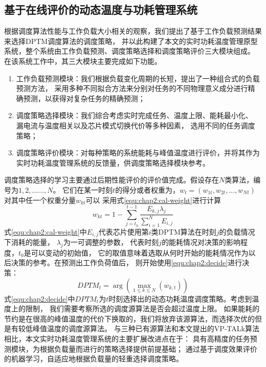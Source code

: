 \subsection{基于在线评价的动态温度与功耗管理系统}
根据调度算法性能与工作负载大小相关的观察，我们提出了基于工作负载预测结果来选择DPTM调度算法的调度策略， 并以此构建了本文的实时功耗温度管理原型系统，整个系统由工作负载预测、调度策略选择和调度策略评价三大模块组成。
在该系统工作中，其三大模块主要完成如下功能。
\begin{enumerate}[1)]
\item 工作负载预测模块：我们根据负载变化周期的长短，提出了一种组合式的负载预测方法， 采用多种不同拟合方法来分别对任务的不同物理意义成分进行精确预测，以获得对复杂任务的精确预测；
\item 调度策略选择模块：我们综合考虑实时完成任务、温度上限、能耗最小化、 漏电流与温度相关以及芯片模式切换代价等多种因素， 选用不同的任务调度策略；
\item 调度策略评价模块：对每种策略的系统能耗与峰值温度进行评价，并将其作为实时功耗温度管理系统的反馈量，供调度策略选择模块参考。
\end{enumerate}

调度策略选择的学习主要通过后期性能评价的评价值完成。假设存在$N$类算法，编号为$1,2,……,N$。 它们在某一时刻$t$的得分或者权重为，$w_t=(w_{1t},w_{2t},...,w_{Nt})$对其中任一个权重分量$w_{kt}$可以 采用式\ref{equ:chap2:cal-weight}进行计算
\begin{equation}
\label{equ:chap2:cal-weight}
w_{kt} = 1- \sum\limits_{j=t_0}^{t-1} \frac{E_{k,j}\lambda_j}{\sum\limits_{i=1}^N E_{i,j}}
\end{equation}
式\ref{equ:chap2:cal-weight}中$E_{i,j}$代表芯片使用第$i$类DPTM算法在时刻$j$的负载情况下消耗的能量， $\lambda_{j}$为一可调整的参数， 代表时刻$j$的能耗情况对决策的影响程度，$t_0$是可以变动的初始值， 它的取值意味着选取从何时开始的能耗情况作为以后决策的参考。在预测出工作负荷值后， 则开始使用\ref{equ:chap2:decide}进行决策：
\begin{equation}
\label{equ:chap2:decide}
DPTM_t = \arg(\max\limits_{1\le k \le N}(w_{k,t}))
\end{equation}
式\ref{equ:chap2:decide}中$DPTM_t$为$t$时刻选择出的动态功耗温度调度策略。考虑到温度上的限制， 我们需要考察所选的调度源算法是否会超过温度上限。 如果能耗的节约是在很高的峰值温度的代价下换取的，我们将放弃该源算法，而选择次优的但是有较低峰值温度的调度源算法。
与三种已有源算法和本文提出的VP-TALk算法相比，本文实时功耗温度管理系统的主要扩展改进点在于： 具有高精度的任务预测模块，为根据负载量而进行的策略选择提供前提基础； 通过基于调度效果评价的机器学习，自适应地根据负载量的轻重选择调度策略。

